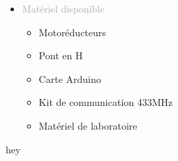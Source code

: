 \documentclass{article}
\renewcommand{\headrulewidth}{0pt} %
\renewcommand{\headrulewidth}{1pt} %
\renewcommand{\headrule}{\color{mainBlue}\hrule width\headwidth height\headrulewidth \vskip-\headrulewidth} %
\begin{document}
\begin{tabular}
\begin{itemize}
\begin{itemize}
        \end{itemize}
        \item \textcolor{darkGray}{Matériel disponible}
        \begin{itemize}
            [label={\textcolor{gray!100}{\checkmark}}, topsep=8pt, partopsep=0pt, itemsep=0.5pt, parsep=2pt,after=\vspace*{-\baselineskip}] 
            \item \textcolor{gray!100}{Motoréducteurs}
            \item \textcolor{gray!100}{Pont en H}
            \item \textcolor{gray!100}{Carte Arduino}
            \item \textcolor{gray!100}{Kit de communication 433MHz}
            \item \textcolor{gray!100}{Matériel de laboratoire}
        \end{itemize}
    \end{itemize}
\end{tabular}

\vfill %






\newpage


{
    \fancyhf{} 
    \fancyhead[L] %
    {
        \vspace*{10pt} %
        \textcolor{darkGray}{Dossier de compétences } 
    } 
    \fancyfoot[C]{\thepage\ / \pageref{LastPage}} %
    \renewcommand{\headrulewidth}{2pt} %
    \renewcommand{\headrule}{\color{mainBlue}\hrule width\headwidth height\headrulewidth \vskip-\headrulewidth} %
}

\thispagestyle{international_experiences}

\vspace*{2cm}


hey


\vfill %
\end{document}
